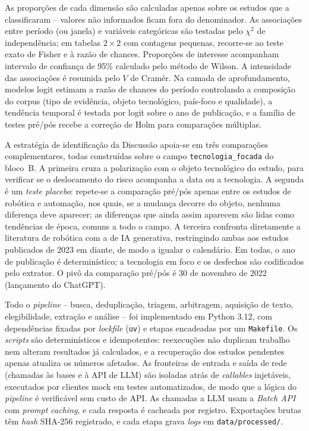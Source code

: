 As proporções de cada dimensão são calculadas apenas sobre os estudos que a classificaram -- valores não informados ficam fora do denominador. As associações entre período (ou janela) e variáveis categóricas são testadas pelo $\chi^2$ de independência; em tabelas $2\times2$ com contagens pequenas, recorre-se ao teste exato de Fisher e à razão de chances. Proporções de  interesse acompanham intervalo de confiança de 95\% calculado pelo método de Wilson. A intensidade das associações é resumida pelo $V$ de Cramér. Na camada de aprofundamento, modelos logit estimam a razão de chances do período controlando a composição do corpus (tipo de evidência, objeto tecnológico, país-foco e qualidade), a tendência temporal é testada por logit sobre o ano de publicação, e a família de testes pré/pós recebe a correção de Holm para comparações múltiplas.

A estratégia de identificação da Discussão apoia-se em três comparações complementares, todas construídas sobre o campo \texttt{tecnologia\_focada} do bloco~B. A primeira cruza a polarização com o objeto tecnológico do estudo, para verificar se o deslocamento do risco acompanha a data ou a tecnologia. A segunda é um \emph{teste placebo}: repete-se a comparação pré/pós apenas entre os estudos de robótica e automação, nos quais, se a mudança decorre do objeto, nenhuma diferença deve aparecer; as diferenças que ainda assim aparecem são lidas como tendências de época, comuns a todo o campo. A terceira confronta diretamente a literatura de robótica com a de IA generativa, restringindo ambas aos estudos publicados de 2023 em diante, de modo a igualar o calendário. Em todas, o ano de publicação é determinístico; a tecnologia em foco e os desfechos são codificados pelo extrator. O pivô da comparação pré/pós é 30 de novembro de 2022 (lançamento do ChatGPT).


Todo o \textit{pipeline} -- busca, deduplicação, triagem, arbitragem, aquisição de texto, elegibilidade, extração e análise -- foi implementado em Python 3.12, com dependências fixadas por \textit{lockfile} (\texttt{uv}) e etapas encadeadas por um \texttt{Makefile}. Os \textit{scripts} são determinísticos e idempotentes: reexecuções não duplicam trabalho nem alteram resultados já calculados, e a recuperação dos estudos pendentes apenas atualiza os números afetados. As fronteiras de entrada e saída de rede (chamadas às bases e à API de LLM) são isoladas atrás de \textit{callables} injetáveis, executados por clientes mock em testes automatizados, de modo que a lógica do \textit{pipeline} é verificável sem custo de API. As chamadas a LLM usam a \textit{Batch API} com \textit{prompt caching}, e cada resposta é cacheada por registro. Exportações brutas têm \textit{hash} SHA-256 registrado, e cada etapa grava \textit{logs} em \texttt{data/processed/}.

